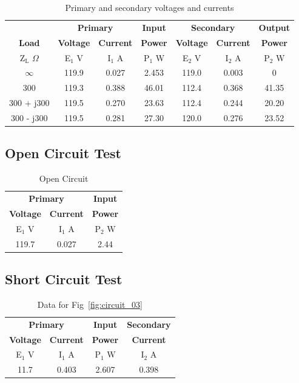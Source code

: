 \documentclass{article}
\begin{document}
\begin{table}[H]
  \centering
  \begin{tabular}{*{7}{c}}
    & \multicolumn{2}{c}{\textbf{Primary}} & \textbf{Input}
    & \multicolumn{2}{c}{\textbf{Secondary}} & \textbf{Output} \\
    \textbf{Load} & \textbf{Voltage} & \textbf{Current} & \textbf{Power}
    & \textbf{Voltage} & \textbf{Current} & \textbf{Power} \\
    Z$_\text{L}$ $\Omega$ & E$_1$ V & I$_1$ A & P$_1$ W
    & E$_2$ V & I$_2$ A &
    P$_2$ W \\
    \hline
    $\infty$   & 119.9 & 0.027 & 2.453 & 119.0 & 0.003 & 0 \\
    300        & 119.3 & 0.388 & 46.01 & 112.4 & 0.368 & 41.35 \\
    300 + j300 & 119.5 & 0.270 & 23.63 & 112.4 & 0.244 & 20.20 \\
    300 - j300 & 119.5 & 0.281 & 27.30 & 120.0 & 0.276 & 23.52 \\
  \end{tabular}
  \caption{Primary and secondary voltages and currents}
  \label{tab:volt_rat}
\end{table}

\subsection{Open Circuit Test}
\begin{table}[H]
  \centering
  \begin{tabular}{*{3}{c}}
    \multicolumn{2}{c}{\textbf{Primary}} & \textbf{Input} \\
    \textbf{Voltage} & \textbf{Current} & \textbf{Power} \\
    E$_1$ V & I$_1$ A & P$_2$ W \\
    \hline
    119.7 & 0.027 & 2.44 \\
  \end{tabular}
  \caption{Open Circuit}
  \label{tab:open_circ}
\end{table}

\subsection{Short Circuit Test}
\begin{table}[H]
  \centering
  \begin{tabular}{*{4}{c}}
    \multicolumn{2}{c}{\textbf{Primary}} & \textbf{Input} & \textbf{Secondary} \\
    \textbf{Voltage} & \textbf{Current} & \textbf{Power} & \textbf{Current} \\
    E$_1$ V & I$_1$ A & P$_1$ W & I$_2$ A \\
    \hline
    11.7 & 0.403 & 2.607 & 0.398 \\
  \end{tabular}
  \caption{Data for Fig~\ref{fig:circuit_03}}
  \label{tab:short_circ}
\end{table}
\end{document}
